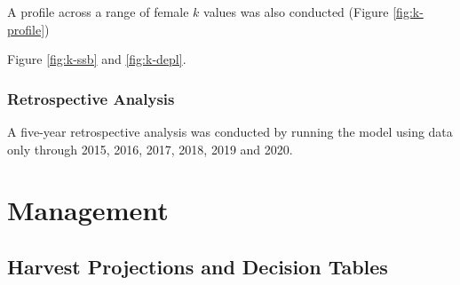 \documentclass[11pt,
  english,
  a4paper,
]{article}
\begin{document}
\leavevmode\tagmcend\tagstructend\par


A profile across a range of female {\(k\)\leavevmode\tagmcend\tagstructend} values was also conducted (Figure \ref{fig:k-profile})

\leavevmode\tagmcend\tagstructend\par


Figure \ref{fig:k-ssb} and \ref{fig:k-depl}.

\leavevmode\tagmcend\tagstructend\par


\hypertarget{retrospective-analysis}{%
\subsubsection{Retrospective Analysis}\label{retrospective-analysis}}

\leavevmode\tagmcend\tagstructend


A five-year retrospective analysis was conducted by running the model using data only through 2015, 2016, 2017, 2018, 2019 and 2020.

\leavevmode\tagmcend\tagstructend\par


\hypertarget{management}{%
\section{Management}\label{management}}

\leavevmode\tagmcend\tagstructend


\hypertarget{harvest-projections-and-decision-tables}{%
\subsection{Harvest Projections and Decision Tables}\label{harvest-projections-and-decision-tables}}

\leavevmode\tagmcend\tagstructend
\end{document}
